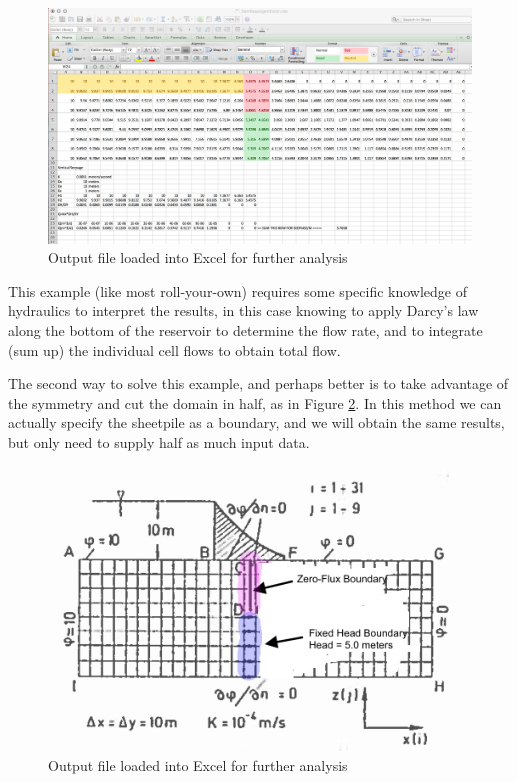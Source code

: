 \begin{figure}[h!] %
   \centering
   \includegraphics[width=6in]{./17-SteadyGroundwaterFlow/DamSeepageInExcel.jpg} 
   \caption{Output file loaded into Excel for further analysis}
   \label{fig:DamSeepageInExcel}
\end{figure}
\clearpage
This example (like most roll-your-own) requires some specific knowledge of hydraulics to interpret the results, in this case knowing to apply Darcy's law along the bottom of the reservoir to determine the flow rate, and to integrate (sum up) the individual cell flows to obtain total flow.

The second way to solve this example, and perhaps better is to take advantage of the symmetry and cut the domain in half, as in Figure \ref{fig:DamSeepageHalf}.  In this method we can actually specify the sheetpile as a boundary, and we will obtain the same results, but only need to supply half as much input data.

\begin{figure}[h!] %
   \centering
   \includegraphics[width=6in]{./17-SteadyGroundwaterFlow/DamSeepageHalf.jpg} 
   \caption{Output file loaded into Excel for further analysis}
   \label{fig:DamSeepageHalf}
\end{figure}

